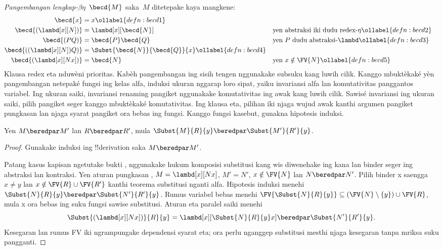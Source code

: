 \documentclass[../../../include/open-logic-section]{subfiles}
\begin{document}
\begin{defn}
  \emph{Pangembangan lengkap-$\beta\eta$}~$\becd{M}$ saka~$M$ ditetepake kaya mangkene:
  \begin{align}
    \becd{x} &= x \ollabel{defn:becd1} \\
    \becd{(\lambd[x][N])} &= \lambd[x][\becd{N}] && \text{yen abstraksi iki dudu redex-$\eta$} \ollabel{defn:becd2}\\
    \becd{(PQ)} &= \becd{P}\becd{Q} && \text{yen $P$ dudu abstraksi-$\lambd$} \ollabel{defn:becd3} \\
    \becd{((\lambd[x][N])Q)} &= \Subst{\becd{N}}{\becd{Q}}{x} \ollabel{defn:becd4} \\
    \becd{(\lambd[x][Nx])} &= \becd{N} && \text{yen $x\notin\FV{N}$} \ollabel{defn:becd5}
  \end{align}
  Klausa redex eta nduwèni prioritas. Kabèh pangembangan ing sisih tengen nggunakake subsuku kang luwih cilik. Kanggo mbuktèkaké yèn pangembangan netepaké fungsi ing kelas alfa, induksi ukuran nggarap loro sipat, yaiku invariansi alfa lan komutativitas panggantos variabel. Ing ukuran saiki, invariansi renaming pangiket nggunakake komutativitas ing awak kang luwih cilik. Sawisé invariansi ing ukuran saiki, pilih pangiket seger kanggo mbuktèkaké komutativitas. Ing klausa eta, pilihan iki njaga wujud awak kanthi argumen pangiket pungkasan lan njaga syarat pangiket ora bebas ing fungsi. Kanggo fungsi kasebut, gunakna hipotesis induksi.
\end{defn}

\begin{lem}
  Yen $M \beredpar M'$
  lan $R \beredpar R'$,
  mula $\Subst{M}{R}{y}
  \beredpar \Subst{M'}{R'}{y}$.
\end{lem}

\begin{proof}
  Gunakake induksi ing !!{derivation}
  saka $M \beredpar M'$.

  Patang kasus kapisan ngetutake bukti , nggunakake hukum komposisi substitusi kang wis diwenehake ing kana lan binder seger ing abstraksi lan kontraksi. Yen aturan pungkasan , $M=\lambd[x][Nx]$, $M'=N'$, $x\notin\FV{N}$ lan $N\beredpar N'$. Pilih binder x saengga $x\neq y$ lan $x\notin\FV{R}\cup\FV{R'}$ kanthi teorema substitusi nganti alfa. Hipotesis induksi menehi $\Subst{N}{R}{y}\beredpar\Subst{N'}{R'}{y}$. Rumus variabel bebas menehi $\FV{\Subst{N}{R}{y}}\subseteq(\FV{N}\setminus\{y\})\cup\FV{R}$, mula x ora bebas ing suku fungsi sawise substitusi. Aturan eta paralel saiki menehi
  \[
    \Subst{(\lambd[x][Nx])}{R}{y}
    =\lambd[x][\Subst{N}{R}{y}x]
    \beredpar\Subst{N'}{R'}{y}.
  \]
  Kesegaran lan rumus FV iki ngrampungake dependensi syarat eta; ora perlu nganggep substitusi mesthi njaga kesegaran tanpa mriksa suku pangganti.
\end{proof}
\end{document}
